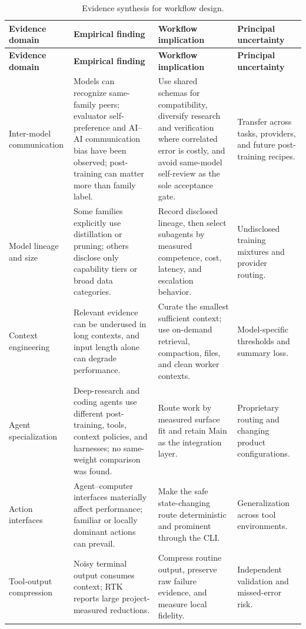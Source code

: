 \documentclass[11pt,a4paper]{article}
\begin{document}
\begingroup
\small
\setlength{\tabcolsep}{4pt}
\begin{longtable}{P{0.20\textwidth}P{0.29\textwidth}P{0.29\textwidth}P{0.14\textwidth}}
\caption{Evidence synthesis for workflow design.}\label{tab:synthesis}\\
\toprule
\textbf{Evidence domain} & \textbf{Empirical finding} & \textbf{Workflow implication} & \textbf{Principal uncertainty} \\
\midrule
\endfirsthead
\toprule
\textbf{Evidence domain} & \textbf{Empirical finding} & \textbf{Workflow implication} & \textbf{Principal uncertainty} \\
\midrule
\endhead
Inter-model communication & Models can recognize same-family peers; evaluator self-preference and AI--AI communication bias have been observed; post-training can matter more than family label. & Use shared schemas for compatibility, diversify research and verification where correlated error is costly, and avoid same-model self-review as the sole acceptance gate. & Transfer across tasks, providers, and future post-training recipes. \\
Model lineage and size & Some families explicitly use distillation or pruning; others disclose only capability tiers or broad data categories. & Record disclosed lineage, then select subagents by measured competence, cost, latency, and escalation behavior. & Undisclosed training mixtures and provider routing. \\
Context engineering & Relevant evidence can be underused in long contexts, and input length alone can degrade performance. & Curate the smallest sufficient context; use on-demand retrieval, compaction, files, and clean worker contexts. & Model-specific thresholds and summary loss. \\
Agent specialization & Deep-research and coding agents use different post-training, tools, context policies, and harnesses; no same-weight comparison was found. & Route work by measured surface fit and retain Main as the integration layer. & Proprietary routing and changing product configurations. \\
Action interfaces & Agent--computer interfaces materially affect performance; familiar or locally dominant actions can prevail. & Make the safe state-changing route deterministic and prominent through the CLI. & Generalization across tool environments. \\
Tool-output compression & Noisy terminal output consumes context; RTK reports large project-measured reductions. & Compress routine output, preserve raw failure evidence, and measure local fidelity. & Independent validation and missed-error risk. \\

\end{longtable}
\end{document}
